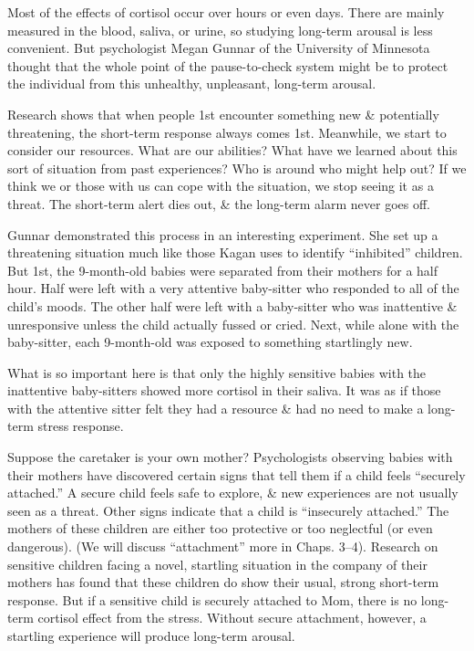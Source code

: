 \documentclass{article}
\numberwithin{equation}{section}
\begin{document}
Most of the effects of cortisol occur over hours or even days. There are mainly measured in the blood, saliva, or urine, so studying long-term arousal is less convenient. But psychologist Megan Gunnar of the University of Minnesota thought that the whole point of the pause-to-check system might be to protect the individual from this unhealthy, unpleasant, long-term arousal.

Research shows that when people 1st encounter something new \& potentially threatening, the short-term response always comes 1st. Meanwhile, we start to consider our resources. What are our abilities? What have we learned about this sort of situation from past experiences? Who is around who might help out? If we think we or those with us can cope with the situation, we stop seeing it as a threat. The short-term alert dies out, \& the long-term alarm never goes off.

Gunnar demonstrated this process in an interesting experiment. She set up a threatening situation much like those Kagan uses to identify ``inhibited'' children. But 1st, the 9-month-old babies were separated from their mothers for a half hour. Half were left with a very attentive baby-sitter who responded to all of the child's moods. The other half were left with a baby-sitter who was inattentive \& unresponsive unless the child actually fussed or cried. Next, while alone with the baby-sitter, each 9-month-old was exposed to something startlingly new.

What is so important here is that only the highly sensitive babies with the inattentive baby-sitters showed more cortisol in their saliva. It was as if those with the attentive sitter felt they had a resource \& had no need to make a long-term stress response.

Suppose the caretaker is your own mother? Psychologists observing babies with their mothers have discovered certain signs that tell them if a child feels ``securely attached.'' A secure child feels safe to explore, \& new experiences are not usually seen as a threat. Other signs indicate that a child is ``insecurely attached.'' The mothers of these children are either too protective or too neglectful (or even dangerous). (We will discuss ``attachment'' more in Chaps. 3--4). Research on sensitive children facing a novel, startling situation in the company of their mothers has found that these children do show their usual, strong short-term response. But if a sensitive child is securely attached to Mom, there is no long-term cortisol effect from the stress. Without secure attachment, however, a startling experience will produce long-term arousal.
\end{document}

